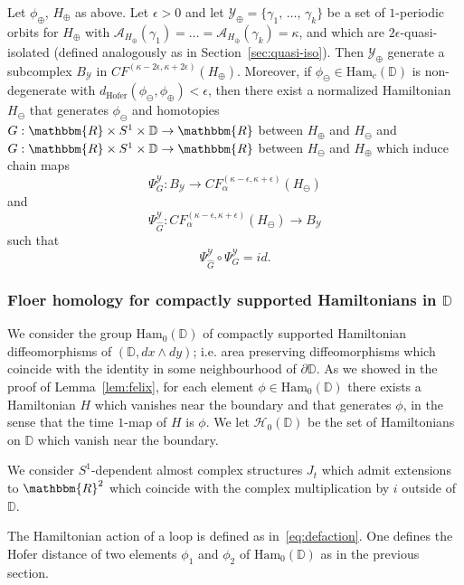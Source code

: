 \documentclass[AHL,Unicode,longabstracts,published]{cedram}
\newcommand{\id}{id}
\newcommand{\R}{\mathbbm{R}}
\newcommand{\D}{\mathbb{D}}
\newcommand{\Ham}{\mathrm{Ham}}
\newcommand{\hofer}{\mathrm{Hofer}}
\newcommand{\clY}{\mathcal{Y}}
\newcommand{\clA}{\mathcal{A}}
\newcommand{\clH}{\mathcal{H}}
\newcommand{\hofer}{\mathrm{Hofer}}
\begin{document}
\begin{prop}\label{prop:quasi-isoD}
Let $\phi_{\oplus}$, $H_{\oplus}$ as above. Let $\epsilon>0$ and let $\clY_{\oplus}=\{\gamma_1,\,\ldots,\,\gamma_k\}$ be a set of $1$-periodic orbits for $H_{\oplus}$ with $\clA_{H_{\oplus}}(\gamma_1)=\ldots=\clA_{H_{\oplus}}(\gamma_k) = \kappa$, and which are $2\epsilon$-quasi-isolated (defined analogously as in Section~\ref{sec:quasi-iso}). Then $\clY_{\oplus}$ generate a subcomplex ${B}_{\clY}$ in $CF^{(\kappa-2\epsilon, \kappa+2\epsilon)}(H_{\oplus})$. Moreover, if $\phi_{\ominus} \in \Ham_c(\D)$ is non-degenerate with $d_{\hofer}(\phi_{\ominus}, \phi_{\oplus}) < \epsilon$, then there exist a normalized Hamiltonian $H_{\ominus}$ that generates $\phi_{\ominus}$ and homotopies $G:\R \times S^1 \times \D \to \R$ between $H_{\oplus}$ and $H_{\ominus}$ and $G:\R \times S^1 \times \D \to \R$ between $H_{\ominus}$ and $H_{\oplus}$ which induce chain maps
\[
\Psi^{\clY}_G: {B}_{\clY} \to CF_{\alpha}^{(\kappa-\epsilon,\kappa+\epsilon)}(H_{\ominus})
\]
and
\[
\Psi^{\clY}_{\widehat{G}}: CF_{\alpha}^{(\kappa-\epsilon,\kappa+\epsilon)}(H_{\ominus})\to {B}_{\clY}
\]
such that
\[
\Psi^{\clY}_{\widehat{G}}\circ \Psi^{\clY}_{{G}} = \id.
\]
\end{prop}



\subsubsection{Floer homology for compactly supported Hamiltonians in \texorpdfstring{$\D$}{D}}

We consider the group $\Ham_0(\D)$ of compactly supported Hamiltonian diffeomorphisms of $(\D,dx \wedge dy)$; i.e. area preserving diffeomorphisms which coincide with the identity in some neighbourhood of $\partial \D$. As we showed in the proof of Lemma~\ref{lem:felix}, for each element $\phi\in \Ham_0(\D)$ there exists a Hamiltonian $H$ which vanishes near the boundary and that generates $\phi$, in the sense that the time $1$-map of $H$ is $\phi$. We let $\clH_0(\D)$ be the set of Hamiltonians on $\D$ which vanish near the boundary.

We consider $S^1$-dependent almost complex structures $J_t$ which admit extensions to $\R^2$ which coincide with the complex multiplication by ${i}$ outside of $\D$.

The Hamiltonian action of a loop is defined as in~\eqref{eq:defaction}. One defines the Hofer distance of two elements $\phi_1$ and $\phi_2$ of $\Ham_0(\D)$ as in the previous section.
\end{document}
